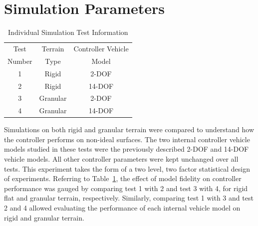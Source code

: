 \documentclass[12pt,onecolumn]{report}
\begin{document}

\section{Simulation Parameters}\label{s:SimParameters}

\begin{table}
\begin{center}
	\begin{tabular}{||c |c | c||} 
		\hline
		Test  & Terrain  & Controller Vehicle \\
		Number &  Type & Model\\ [0.5ex] 	
		\hline\hline
		1 & Rigid & 2-DOF \\ 
		\hline
		2 & Rigid & 14-DOF \\
		\hline
		3 & Granular & 2-DOF \\
		\hline
		4 & Granular & 14-DOF \\
		\hline
	\end{tabular}
\end{center}
\caption{Individual Simulation Test Information}
\label{t:TestMatrix}
\end{table}

Simulations on both rigid and granular terrain were compared to understand how the controller performs on non-ideal surfaces. The two internal controller vehicle models studied in these tests were the previously described 2-DOF and 14-DOF vehicle models. All other controller parameters were kept unchanged over all tests. This experiment takes the form of a two level, two factor statistical design of experiments. Referring to Table~\ref{t:TestMatrix}, the effect of model fidelity on controller performance was gauged by comparing test 1 with 2 and test 3 with 4, for rigid flat and granular terrain, respectively. 
Similarly, comparing test 1 with 3 and test 2 and 4 allowed evaluating the performance of each internal vehicle model on rigid and granular terrain.
\end{document}
